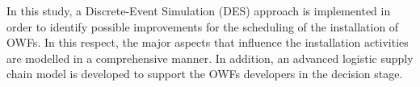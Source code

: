 In this study, a Discrete-Event Simulation (DES) approach is implemented in order to identify possible improvements for the scheduling of the installation of OWFs. In this respect, the major aspects that influence the installation activities are modelled in a comprehensive manner. In addition, an advanced logistic supply chain model is developed to support the OWFs developers in the decision stage.